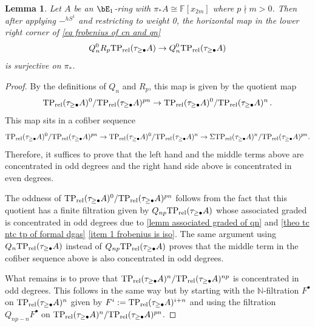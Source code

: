 \documentclass[english,10pt]{amsart}
\newcommand{\rel}{\textup{rel}}
\newcommand{\field}{\mathbb{F}}
\newtheorem{lemm}{Lemma}[section]
\theoremstyle{definition}
\numberwithin{equation}{section}
\newcommand{\rtp}{\mathrm{TP}_{\rel}}
\newcommand{\N}{\mathbb{N}}
\newcommand{\wtw}{\tau_{\geq \bullet}}
\newcommand{\pis}{\pi_*}
\begin{document}
\begin{lemm}\label{lemm weight reducing map is surjective for tp}
Let $A$ be an $\bE_1$-ring with $\pis A \cong \field[x_{2m}]$ where $p \nmid m>0$. Then after applying $-^{hS^1}$ and restricting to weight 0, the horizontal map in the lower right corner of \eqref{eq frobenius of cn and qn} 
\begin{equation}\label{lower right corner of eq frobenius of cn and qn}
Q_n^0R_p \rtp(\wtw A) \to Q_n^0 \rtp(\wtw A)
\end{equation}
is surjective on $\pi_*$.
\end{lemm}
\begin{proof}
By the definitions of $Q_n$ and $R_p$, this map is given by the quotient map  
\[
\rtp(\wtw A)^{0}/\rtp(\wtw A)^{pn} \to \rtp(\wtw A)^{0}/\rtp(\wtw A)^{n} \,.
\]
This map sits in a cofiber sequence 
\[\rtp(\wtw A)^{0}/\rtp(\wtw A)^{pn} \to \rtp(\wtw A)^{0}/\rtp(\wtw A)^{n} \to \Sigma \rtp(\wtw A)^{n}/\rtp(\wtw A)^{pn}.\]
Therefore, it suffices to prove that the left hand and the middle terms above are concentrated in odd degrees and the right hand side above is concentrated in even degrees. 

The oddness of $\rtp(\wtw A)^{0}/\rtp(\wtw A)^{pn} $ follows from the fact that this quotient has a finite filtration given by $Q_{np}\rtp(\wtw A)$ whose associated graded is concentrated in odd degrees due to \autoref{lemm associated graded of qn} and \autoref{theo tc ntc tp of formal dgas} \eqref{item 1 frobenius is iso}. The same argument using  $Q_{n}\rtp(\wtw A)$ instead of $Q_{np}\rtp(\wtw A)$ proves that the middle term in the cofiber sequence above is also concentrated in odd degrees. 

What remains is to prove that $\rtp(\wtw A)^{n}/\rtp(\wtw A)^{np}$ is concentrated in odd degrees. This follows in the same way but by starting with the $\N$-filtration $F^\bullet$ on $\rtp(\wtw A)^{n}$ given by $F^i := \rtp(\wtw A)^{i+n}$ and using the filtration $Q_{np-n}F^{\bullet}$ on $ \rtp(\wtw A)^{n}/\rtp(\wtw A)^{pn}$.

\end{proof}
\end{document}
